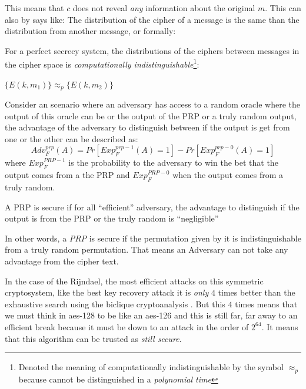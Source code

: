 \documentclass[10pt,a4paper,twoside]{llncs}
\begin{document}
This means that $c$ does not reveal \emph{any} information about the original $m$. This can also by says like: The distribution of the cipher of a message is the same than the distribution from another message, or formally:
\begin{definition}
 For a perfect secrecy system, the distributions of the ciphers between messages in the cipher space is \emph{computationally indistinguishable}\footnote{Denoted the meaning of computationally indistinguishable by the symbol $\approx_p$ because cannot be distinguished in a \emph{polynomial time}}:
 \begin{center}
  $\{ E(k,m_1) \} \approx_p \{ E(k,m_2) \} $
 \end{center}
\end{definition}

Consider an scenario where an adversary has access to a random oracle where the output of this oracle can be or the output of the PRP or a truly random output, the advantage of the adversary to distinguish between if the output is get from one or the other can be described as:
\begin{equation}\label{eq:prpAdv}
 {Adv}_{F}^{prp}(A) = Pr[{Exp}_{F}^{prp-1}(A)=1]-Pr[{Exp}_{F}^{prp-0}(A)=1]
\end{equation}
where ${Exp}_{F}^{PRP-1}$ is the probability to the adversary to win the bet that the output comes from a the PRP and ${Exp}_{F}^{PRP-0}$ when the output comes from a truly random.

\begin{definition}\label{def:securePRP}
 A PRP is secure if for all ``efficient'' adversary, the advantage to distinguish if the output is from the PRP or the truly random is ``negligible''
\end{definition}

In other words, a \emph{PRP} is secure if the permutation given by it is indistinguishable from a truly random permutation. That means an Adversary can not take any advantage from the cipher text.

In the case of the Rijndael, the most efficient attacks on this symmetric cryptosystem, like the best key recovery attack it is \emph{only} $4$ times better than the exhaustive search using the biclique cryptoanalysis \cite{biclique-fullaes}. But this $4$ times means that we must think in aes-128 to be like an aes-126 and this is still far, far away to an efficient break because it must be down to an attack in the order of $2^{64}$. It means that this algorithm can be trusted as \emph{still secure}.
\end{document}
